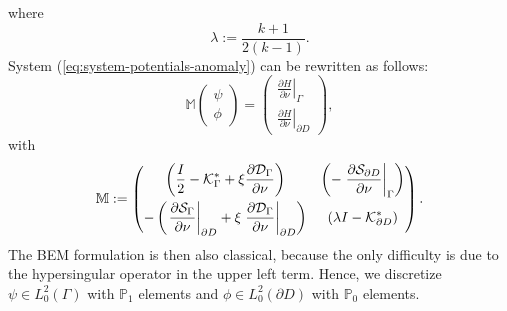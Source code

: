 \documentclass[final]{siamltex}
\newcommand{\ds}{\displaystyle}
\newcommand{\nm}{\noalign{\smallskip}}
\numberwithin{equation}{section}
\numberwithin{figure}{section}
\numberwithin{table}{section}
\begin{document}
where
\[
\lambda:=\frac{k+1}{2(k-1)}.
\]
System (\ref{eq:system-potentials-anomaly}) can be rewritten as
follows:
\[
\mathbb{M}\left(\begin{alignedat}{1}\psi\\
\phi
\end{alignedat}
\right)=\left(\begin{alignedat}{1}\left.\frac{\partial H}{\partial\nu}\right|_{\Gamma}\\
\left.\frac{\partial H}{\partial\nu}\right|_{\partial D}
\end{alignedat}
\right),
\]
with
\[
\mathbb{M}:=\left(\begin{matrix} \left( \ds
\frac{I}{2}-\mathcal{K}_{\Gamma}^{*}
+\xi\frac{\partial\mathcal{D}_{\Gamma}}{\partial\nu}\right) &\ds
\left(-\left.\frac{\partial\mathcal{S}_{\partial D}}{\partial\nu}\right|_{\Gamma}\right)\\
\nm \ds
-\left(\left.\frac{\partial\mathcal{S}_{\Gamma}}{\partial\nu}\right|_{\partial
D}+\xi\left.\frac{\partial
\mathcal{D}_{\Gamma}}{\partial\nu}\right|_{\partial D}\right) &
\ds \left(\lambda I-\mathcal{K}_{\partial D}^{*}\right)
\end{matrix}
\right).
\]
The BEM formulation is then also classical, because the only
difficulty is due to the hypersingular operator in the upper left
term. Hence, we discretize $\psi\in L_0^{2}(\Gamma)$ with
$\mathbb{P}_{1}$ elements and $\phi\in L_{0}^{2}(\partial D)$ with
$\mathbb{P}_{0}$ elements.





  

\end{document}
